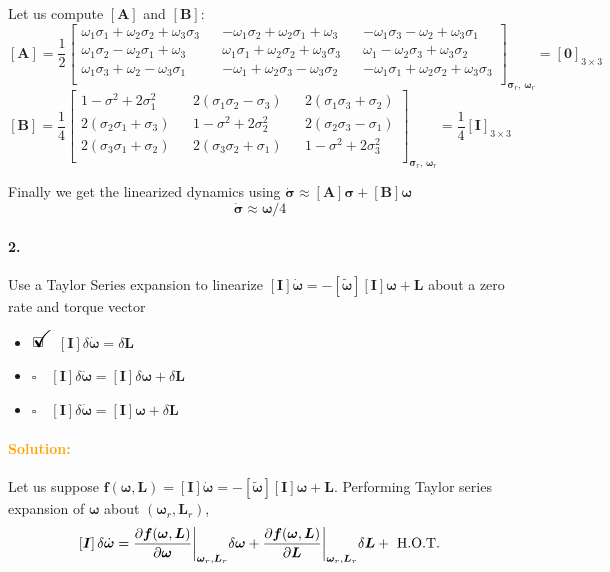 \documentclass[12pt, a4paper]{article}
\newcommand{\ans}{\item[]$\rlap{\LARGE{\checkmark}}\square\quad$}
\newcommand{\noans}{\item[]$\square\quad$}
\begin{document}
Let us compute $[\bm{A}]$ and $[\bm{B}]$:
$$
[\bm{A}]=\frac{1}{2}
\begin{bmatrix}
    \omega_{1}\sigma_{1}+\omega_{2}\sigma_{2}+\omega_{3}\sigma_{3}&&-\omega_{1}\sigma_{2}+\omega_{2}\sigma_{1}+\omega_{3}&&-\omega_{1}\sigma_{3}-\omega_{2}+\omega_{3}\sigma_{1}\\
    \omega_{1}\sigma_{2}-\omega_{2}\sigma_{1}+\omega_{3}&&\omega_{1}\sigma_{1}+\omega_{2}\sigma_{2}+\omega_{3}\sigma_{3}&&\omega_{1}-\omega_{2}\sigma_{3}+\omega_{3}\sigma_{2}\\
    \omega_{1}\sigma_{3}+\omega_{2}-\omega_{3}\sigma_{1}&&-\omega_{1}+\omega_{2}\sigma_{3}-\omega_{3}\sigma_{2}&&-\omega_{1}\sigma_{1}+\omega_{2}\sigma_{2}+\omega_{3}\sigma_{3}\\
\end{bmatrix}_{\bm{\sigma}_{r},\,\bm{\omega}_{r}}
= [\bm{0}]_{3\times 3}
$$
$$
[\bm{B}]=\frac{1}{4}
\begin{bmatrix}
    1-\sigma^{2}+2\sigma_{1}^{2} && 2(\sigma_{1}\sigma_{2}-\sigma_{3}) && 2(\sigma_{1}\sigma_{3}+\sigma_{2}) \\
    2(\sigma_{2}\sigma_{1}+\sigma_{3}) && 1-\sigma^{2}+2\sigma_{2}^{2} && 2(\sigma_{2}\sigma_{3}-\sigma_{1}) \\
    2(\sigma_{3}\sigma_{1}+\sigma_{2}) && 2(\sigma_{3}\sigma_{2}+\sigma_{1}) && 1-\sigma^{2}+2\sigma_{3}^{2} \\
\end{bmatrix}_{\bm{\sigma}_{r},\,\bm{\omega}_{r}}
=\frac{1}{4}[\bm{I}]_{3\times 3}
$$

Finally we get the linearized dynamics using $\dot{\bm{\sigma}}\approx[\bm{A}]\bm{\sigma}+[\bm{B}]\bm{\omega}$
$$
\dot{\bm{\sigma}}\approx\bm{\omega}/4
$$

\paragraph{2.}
Use a Taylor Series expansion to linearize $[\bm{I}]\dot{\bm{\omega}} = -[\tilde{\bm{\omega}}][\bm{I}]\bm{\omega} + \bm{L}$ about a zero rate and torque vector

\begin{itemize}
\ans $[\bm{I}]\delta\dot{\bm{\omega}} =\delta \bm{L}$
\noans $[\bm{I}]\delta\dot{\bm{\omega}} =[\bm{I}]\delta\bm{\omega} + \delta \bm{L}$
\noans $[\bm{I}]\delta\dot{\bm{\omega}} =[\bm{I}]\bm{\omega} + \delta \bm{L}$
\end{itemize}

\paragraph{\textcolor{orange}{Solution:}}
Let us suppose $\bm{f}(\bm{\omega},\bm{L})=[\bm{I}]\dot{\bm{\omega}}=-[\tilde{\bm{\omega}}][\bm{I}]\bm{\omega}+\bm{L}$. Performing Taylor series expansion of $\bm{\omega}$ about $(\bm{\omega}_{r}, \bm{L}_{r})$,
$$
[\bm{\bm{I}}]\,\delta\dot{\bm{\omega}} = \frac{\partial\bm{f}(\bm{\omega},\bm{L})}{\partial \bm{\omega}}\biggr\rvert_{\bm{\omega}_{r},\bm{L}_{r}}\delta\bm{\omega}+\frac{\partial\bm{f}(\bm{\omega},\bm{L})}{\partial\bm{L}}\biggr\rvert_{\bm{\omega}_{r},\bm{L}_{r}}\delta\bm{L} + \textnormal{ H.O.T.}
$$
\end{document}
